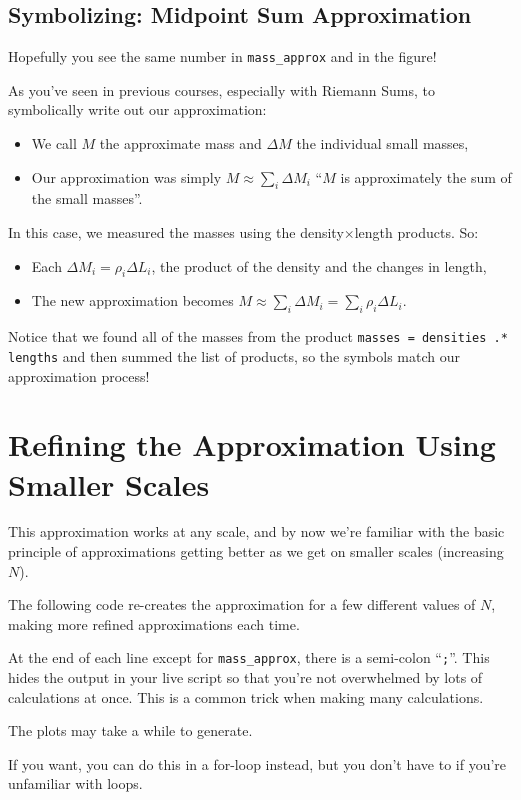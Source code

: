 \documentclass{ximera}
\begin{document}
\subsection*{Symbolizing: Midpoint Sum Approximation}

Hopefully you see the same number in \texttt{mass\_approx} and in the figure!

As you've seen in previous courses, especially with Riemann Sums, to symbolically write out our approximation:
\begin{itemize}
\item We call $M$ the approximate mass and $\Delta M$ the individual small masses,
\item Our approximation was simply $M \approx \sum_i \Delta M_i$ ``$M$ is approximately the sum of the small masses''.
\end{itemize}

In this case, we measured the masses using the density$\times$length products. So:
\begin{itemize}
\item Each $\Delta M_i = \rho_i \Delta L_i$, the product of the density and the changes in length,
\item The new approximation becomes $M \approx \sum_i \Delta M_i = \sum_i \rho_i \Delta L_i$.
\end{itemize}

Notice that we found all of the masses from the product \texttt{masses = densities .* lengths} and then summed the list of products, so the symbols match our approximation process!

\section*{Refining the Approximation Using Smaller Scales}

This approximation works at any scale, and by now we're familiar with the basic principle of approximations getting better as we get on smaller scales (increasing $N$).

The following code re-creates the approximation for a few different values of $N$, making more refined approximations each time.

\begin{remark}
At the end of each line except for \texttt{mass\_approx}, there is a semi-colon ``\texttt{;}''. This hides the output in your live script so that you're not overwhelmed by lots of calculations at once. This is a common trick when making many calculations.

The plots may take a while to generate.

If you want, you can do this in a for-loop instead, but you don't have to if you're unfamiliar with loops.
\end{remark}
\end{document}
